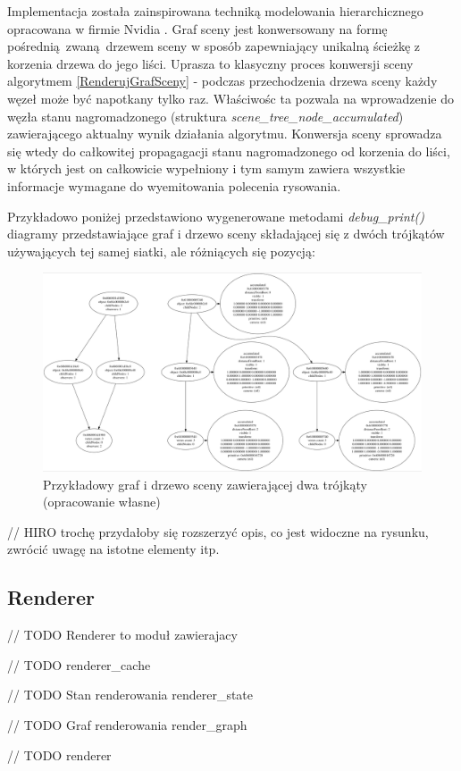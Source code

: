 Implementacja została zainspirowana techniką modelowania hierarchicznego opracowana w firmie Nvidia \cite{ADVANCEDSCENEGRAPH}.
Graf sceny jest konwersowany na formę pośrednią zwaną drzewem sceny w sposób zapewniający unikalną ścieżkę z korzenia drzewa do jego liści.
Uprasza to klasyczny proces konwersji sceny algorytmem \ref{RenderujGrafSceny} - podczas przechodzenia drzewa sceny każdy węzeł może być napotkany tylko raz.
Właściwośc ta pozwala na wprowadzenie do węzła stanu nagromadzonego (struktura \textit{scene\_tree\_node\_accumulated}) zawierającego aktualny wynik działania algorytmu.
Konwersja sceny sprowadza się wtedy do całkowitej propagagacji stanu nagromadzonego od korzenia do liści, w których jest on całkowicie wypełniony i tym samym zawiera wszystkie informacje wymagane do wyemitowania polecenia rysowania.

Przykładowo poniżej przedstawiono wygenerowane metodami \textit{debug\_print()} diagramy przedstawiające graf i drzewo sceny składającej się z dwóch trójkątów używających tej samej siatki, ale różniących się pozycją:
\begin{figure}[htbp]
	\centering
	\includegraphics[width=1.0\textwidth]{images/scene_graph_tree.png}
	\caption{Przykładowy graf i drzewo sceny zawierającej dwa trójkąty (opracowanie własne)}
	\label{triangles_scene_graph}
\end{figure}
// HIRO trochę przydałoby się rozszerzyć opis, co jest widoczne na rysunku, zwrócić uwagę na istotne elementy itp.


\subsection{Renderer}

// TODO Renderer to moduł zawierajacy 

// TODO renderer\_cache

// TODO Stan renderowania renderer\_state

// TODO Graf renderowania render\_graph

// TODO renderer